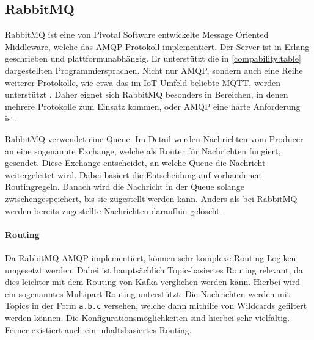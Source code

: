 \subsection{RabbitMQ}
RabbitMQ ist eine von Pivotal Software entwickelte Message Oriented Middleware,
welche das AMQP Protokoll implementiert. Der Server ist in Erlang geschrieben und
plattformunabhängig. Er unterstützt die in \ref{compability:table} dargestellten
Programmiersprachen. Nicht nur AMQP, sondern auch eine Reihe weiterer Protokolle,
wie etwa das im IoT-Umfeld beliebte MQTT, werden unterstützt \cite{dobbelaere2017kafka}.
Daher eignet sich RabbitMQ besonders in Bereichen, in denen mehrere Protokolle zum
Einsatz kommen, oder AMQP eine harte Anforderung ist.

RabbitMQ verwendet eine Queue. Im Detail werden Nachrichten vom Producer an eine
sogenannte Exchange, welche als Router für Nachrichten fungiert, gesendet.
Diese Exchange entscheidet, an welche Queue die Nachricht weitergeleitet wird.
Dabei basiert die Entscheidung auf vorhandenen Routingregeln. Danach wird die
Nachricht in der Queue solange zwischengespeichert, bis sie zugestellt werden
kann. Anders als bei RabbitMQ werden bereits zugestellte Nachrichten daraufhin
gelöscht. \cite{RabbitMQ:online}

\paragraph{Routing}
Da RabbitMQ AMQP implementiert, können sehr komplexe Routing-Logiken umgesetzt
werden. Dabei ist hauptsächlich Topic-basiertes Routing relevant, da dies leichter mit dem
Routing von Kafka verglichen werden kann.
Hierbei wird ein sogenanntes Multipart-Routing unterstützt: Die Nachrichten
werden mit Topics in der Form \texttt{a.b.c} versehen, welche dann mithilfe
von Wildcards gefiltert werden können. Die Konfigurationsmöglichkeiten sind
hierbei sehr vielfältig. Ferner existiert auch ein inhaltsbasiertes Routing. \cite{RabbitMQ:online}

